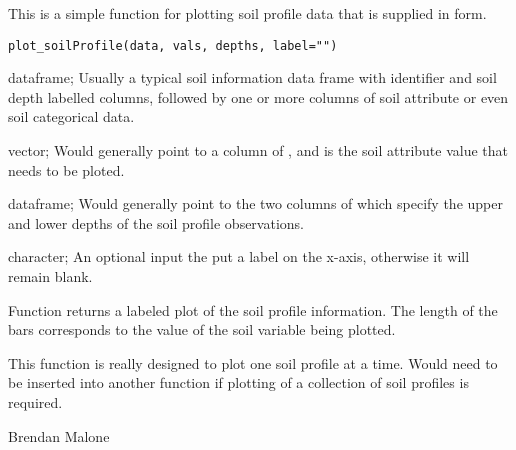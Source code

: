 \documentclass[a4paper]{book}
\begin{document}
%
\begin{Description}
This is a simple function for plotting soil profile data that is supplied in  form.
\end{Description}
%
\begin{Usage}
\begin{verbatim}
plot_soilProfile(data, vals, depths, label="")
\end{verbatim}
\end{Usage}
%
\begin{Arguments}
\begin{ldescription}
\item[\code{data}] dataframe; Usually a typical soil information data frame with identifier and soil depth labelled columns, followed by one or more columns of soil attribute or even soil categorical data.
\item[\code{vals}] vector; Would generally point to a column of , and is the soil attribute value that needs to be ploted.    
\item[\code{depths}] dataframe; Would generally point to the two columns of  which specify the upper and lower depths of the soil profile observations.
\item[\code{label}] character; An optional input the put a label on the x-axis, otherwise it will remain blank.
\end{ldescription}
\end{Arguments}
%
\begin{Value}
Function returns a labeled plot of the soil profile information. The length of the bars corresponds to the value of the soil variable being plotted.
\end{Value}
%
\begin{Note}
This function is really designed to plot one soil profile at a time. Would need to be inserted into another function if plotting of a collection of soil profiles is required. 
\end{Note}
%
\begin{Author}
Brendan Malone
\end{Author}
%
\begin{Examples}
\end{Examples}
\end{document}

